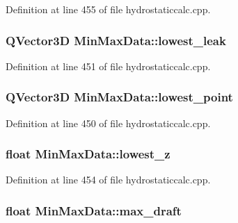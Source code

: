 Definition at line 455 of file hydrostaticcalc.\-cpp.

\hypertarget{structMinMaxData_ab422a9e59c6bb2bc9a28bbb002d5b09f}{
\subsubsection[{lowest\-\_\-leak}]{\setlength{\rightskip}{0pt plus 5cm}Q\-Vector3\-D Min\-Max\-Data\-::lowest\-\_\-leak}}\label{structMinMaxData_ab422a9e59c6bb2bc9a28bbb002d5b09f}


Definition at line 451 of file hydrostaticcalc.\-cpp.

\hypertarget{structMinMaxData_a3d27ad5adf37db4728e700f914bc2ab3}{
\subsubsection[{lowest\-\_\-point}]{\setlength{\rightskip}{0pt plus 5cm}Q\-Vector3\-D Min\-Max\-Data\-::lowest\-\_\-point}}\label{structMinMaxData_a3d27ad5adf37db4728e700f914bc2ab3}


Definition at line 450 of file hydrostaticcalc.\-cpp.

\hypertarget{structMinMaxData_abe1d706394e9836f49ef8cb5dff7bd99}{
\subsubsection[{lowest\-\_\-z}]{\setlength{\rightskip}{0pt plus 5cm}float Min\-Max\-Data\-::lowest\-\_\-z}}\label{structMinMaxData_abe1d706394e9836f49ef8cb5dff7bd99}


Definition at line 454 of file hydrostaticcalc.\-cpp.

\hypertarget{structMinMaxData_a10cf6d95b5b6d24b6b2e874e9fb05362}{
\subsubsection[{max\-\_\-draft}]{\setlength{\rightskip}{0pt plus 5cm}float Min\-Max\-Data\-::max\-\_\-draft}}\label{structMinMaxData_a10cf6d95b5b6d24b6b2e874e9fb05362}


